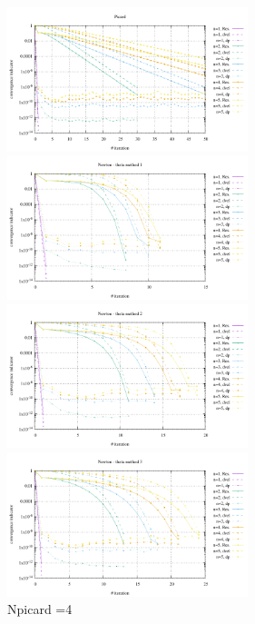 \begin{center}
\includegraphics[width=7cm]{python_codes/fieldstone_87/results/experiment_08/conv_picard.pdf}
\includegraphics[width=7cm]{python_codes/fieldstone_87/results/experiment_08/conv_meth1.pdf}\\
\includegraphics[width=7cm]{python_codes/fieldstone_87/results/experiment_08/conv_meth2.pdf}
\includegraphics[width=7cm]{python_codes/fieldstone_87/results/experiment_08/conv_meth3.pdf}\\
{\captionfont Npicard =4}
\end{center}

